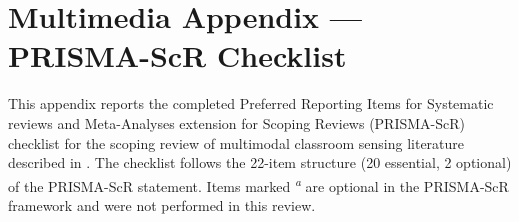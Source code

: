 
\section*{Multimedia Appendix --- PRISMA-ScR Checklist}\label{sec:appendix-prisma}

This appendix reports the completed Preferred Reporting Items for Systematic reviews and Meta-Analyses extension for Scoping Reviews (PRISMA-ScR) checklist \parencite{Tricco2018_prisma_scr} for the scoping review of multimodal classroom sensing literature described in . The checklist follows the 22-item structure (20 essential, 2 optional) of the PRISMA-ScR statement. Items marked \textsuperscript{\textit{a}} are optional in the PRISMA-ScR framework and were not performed in this review.

\vspace{1em}

